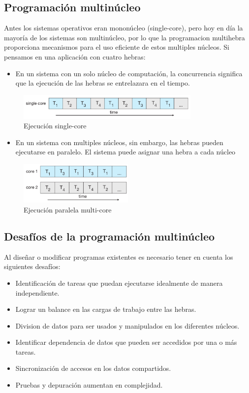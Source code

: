 \documentclass{templateNote}
\begin{document}
\subsection*{Programación multinúcleo}
Antes los sistemas operativos eran mononúcleo (single-core), pero hoy en día la mayoría de los sistemas son multinúcleo, por lo que la programacion multihebra proporciona mecanismos para el uso eficiente de estos multiples núcleos.
Si pensamos en una aplicación con cuatro hebras:
\begin{itemize}
    \item En un sistema con un solo núcleo de computación, la concurrencia significa que la ejecución de las hebras se entrelazara en el tiempo.
\end{itemize}
\begin{figure}[H]
    \centering
    \includegraphics[width=0.8\textwidth]{img/mononucleo.png}
    \caption{Ejecución single-core}
\end{figure}
\begin{itemize}
    \item En un sistema con multiples núcleos, sin embargo, las hebras pueden ejecutarse en paralelo. El sistema puede asignar una hebra a cada núcleo
\end{itemize}
\begin{figure}[H]
    \centering
    \includegraphics[width=0.5\textwidth]{img/multinucleo.png}
    \caption{Ejecución paralela multi-core}
\end{figure}

\subsection*{Desafíos de la programación multinúcleo}
Al diseñar o modificar programas existentes es necesario tener en cuenta los siguientes desafíos:
\begin{itemize}
    \item Identificación de tareas que puedan ejecutarse idealmente de manera independiente.
    \item Lograr un balance en las cargas de trabajo entre las hebras.
    \item Division de datos para ser usados y manipulados en los diferentes núcleos.
    \item Identificar dependencia de datos que pueden ser accedidos por una o más tareas. 
    \item Sincronización de accesos en los datos compartidos.
    \item Pruebas y depuración aumentan en complejidad.
\end{itemize}
\end{document}
